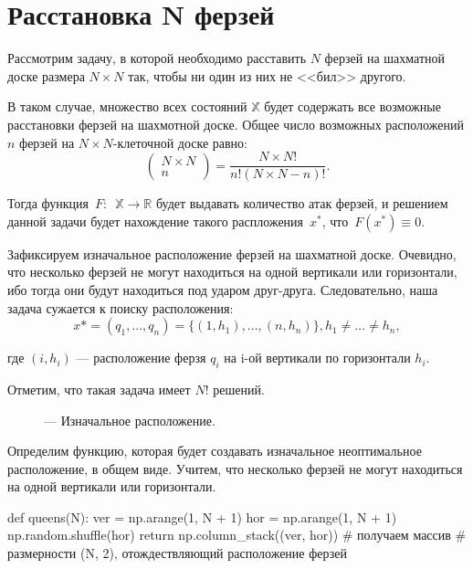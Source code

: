 

\section{Расстановка N ферзей}
\label{section:queens}
\noindent Рассмотрим задачу, в которой необходимо расставить $N$ ферзей на шахматной доске размера $N \times  N$ так, чтобы ни один из них не <<бил>> другого.

В таком случае, множество всех состояний $\mathbb{X}$ будет содержать все возможные расстановки ферзей на шахмотной доске. Общее число возможных расположений $n$ ферзей на $N \times N$-клеточной доске равно:
\[
{\begin{pmatrix} N \times N  \\ n \end{pmatrix}} = \dfrac{N \times N!}{n! (N \times N - n)!}.
\]

Тогда  функция~$F:$~$\mathbb{X} \to \mathbb{R}$ будет выдавать количество атак ферзей, и решением данной задачи будет нахождение такого распложения~$x^{*}$, что~$F(x^*) \equiv 0$.

Зафиксируем изначальное расположение ферзей на шахматной доске. Очевидно, что несколько ферзей не могут находиться на одной вертикали или горизонтали, ибо тогда они будут находиться под ударом друг-друга. Следовательно, наша задача сужается к поиску расположения:
\begin{equation}
x* = (q_1, ..., q_n) = \{(1, h_1), ..., (n, h_n)\}, h_1 \neq ...  \neq h_n,
\end{equation}

где $(i, h_i)$ — расположение ферзя $q_i$ на i-ой вертикали по горизонтали $h_i$.

Отметим, что такая задача имеет $N!$ решений.

\newgame
{}

\begin{figure}[h!]
	\begin{center}
		\showboard
		\legend{}
		\caption{ --- Изначальное расположение.}
		\label{img:nonopt}
	\end{center}
\end{figure}
Определим функцию, которая будет создавать изначальное неоптимальное расположение, в общем виде. Учитем, что несколько ферзей не могут находиться на одной вертикали или горизонтали.

\begin{pyin}
def queens(N):
  ver = np.arange(1, N + 1)
  hor = np.arange(1, N + 1)
  np.random.shuffle(hor)
  return np.column_stack((ver, hor)) # получаем массив
  # размерности (N, 2), отождествляющий расположение ферзей
\end{pyin}

